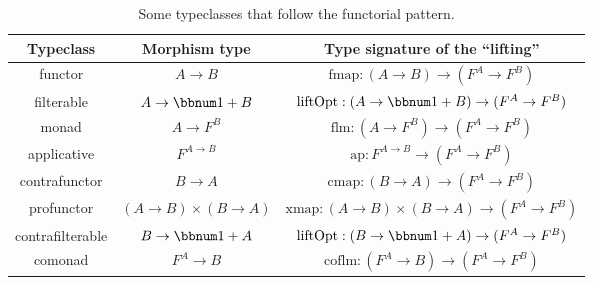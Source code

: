 \begin{table}
\begin{centering}
\begin{tabular}{|c|c|c|}
\hline 
\textbf{\footnotesize{}Typeclass} & \textbf{\footnotesize{}Morphism type} & \textbf{\footnotesize{}Type signature of the \textsf{``}lifting\textsf{''}}\tabularnewline
\hline 
\hline 
{\footnotesize{}functor} & {\footnotesize{}$A\rightarrow B$} & {\footnotesize{}$\text{fmap}:\left(A\rightarrow B\right)\rightarrow(F^{A}\rightarrow F^{B})$}\tabularnewline
\hline 
{\footnotesize{}filterable} & {\footnotesize{}$A\rightarrow\bbnum 1+B$} & {\footnotesize{}$\text{liftOpt}:\left(A\rightarrow\bbnum 1+B\right)\rightarrow(F^{A}\rightarrow F^{B})$}\tabularnewline
\hline 
{\footnotesize{}monad} & {\footnotesize{}$A\rightarrow F^{B}$} & {\footnotesize{}$\text{flm}:(A\rightarrow F^{B})\rightarrow(F^{A}\rightarrow F^{B})$}\tabularnewline
\hline 
{\footnotesize{}applicative} & {\footnotesize{}$F^{A\rightarrow B}$} & {\footnotesize{}$\text{ap}:F^{A\rightarrow B}\rightarrow(F^{A}\rightarrow F^{B})$}\tabularnewline
\hline 
{\footnotesize{}contrafunctor} & {\footnotesize{}$B\rightarrow A$} & {\footnotesize{}$\text{cmap}:\left(B\rightarrow A\right)\rightarrow(F^{A}\rightarrow F^{B})$}\tabularnewline
\hline 
{\footnotesize{}profunctor} & {\footnotesize{}$\left(A\rightarrow B\right)\times\left(B\rightarrow A\right)$} & {\footnotesize{}$\text{xmap}:\left(A\rightarrow B\right)\times\left(B\rightarrow A\right)\rightarrow(F^{A}\rightarrow F^{B})$}\tabularnewline
\hline 
{\footnotesize{}contrafilterable} & {\footnotesize{}$B\rightarrow\bbnum 1+A$} & {\footnotesize{}$\text{liftOpt}:\left(B\rightarrow\bbnum 1+A\right)\rightarrow(F^{A}\rightarrow F^{B})$}\tabularnewline
\hline 
{\footnotesize{}comonad\index{comonad}} & {\footnotesize{}$F^{A}\rightarrow B$} & {\footnotesize{}$\text{coflm}:(F^{A}\rightarrow B)\rightarrow(F^{A}\rightarrow F^{B})$}\tabularnewline
\hline 
\end{tabular}
\par\end{centering}
\caption{Some typeclasses that follow the functorial pattern.}
\label{tab:functorial-typeclasses}
\end{table}

